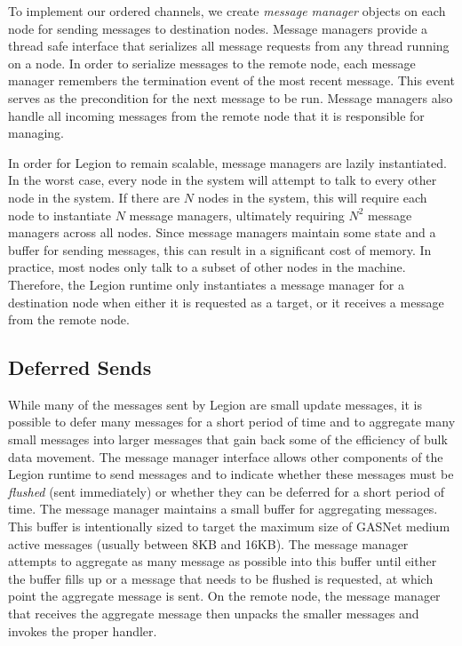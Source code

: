 To implement our ordered channels, we create 
{\em message manager} objects on each node for 
sending messages to destination nodes.  Message
managers provide a thread safe interface that 
serializes all message requests from any thread running
on a node. In order to serialize messages to the
remote node, each message manager remembers the 
termination event of the most recent message.
This event serves as the
precondition for the next message to be run.
Message managers also handle all incoming messages
from the remote node that it is responsible
for managing.

In order for Legion to remain scalable, message managers
are lazily instantiated.  In the worst case, every node
in the system will attempt to talk to every other node
in the system.  If there are $N$ nodes in the system,
this will require each node to instantiate $N$ message
managers, ultimately requiring $N^2$ message managers
across all nodes.  Since message managers maintain some
state and a buffer for sending messages, this can result
in a significant cost of memory.  In practice, 
most nodes only talk to a subset of other nodes in the
machine.  Therefore, the Legion runtime only instantiates
a message manager for a destination node when either
it is requested as a target, or it receives a message 
from the remote node. 

\subsection{Deferred Sends}
\label{subsec:deferredsends}

While many of the messages sent by Legion are small
update messages, it is possible to defer many messages
for a short period of time and to aggregate many small
messages into larger messages that gain back some
of the efficiency of bulk data movement. The message
manager interface allows other components of the Legion
runtime to send messages and to indicate whether these
messages must be {\em flushed} (sent immediately) or
whether they can be deferred for a short period of
time. The message manager maintains a small buffer
for aggregating messages.  This buffer is intentionally
sized to target the maximum size of GASNet medium
active messages (usually between 8KB and 16KB). 
The message manager attempts to aggregate as many
message as possible into this buffer until either
the buffer fills up or a message that needs to be
flushed is requested, at which point the aggregate
message is sent. On the remote node, the message
manager that receives the aggregate message then
unpacks the smaller messages and invokes the 
proper handler. 

